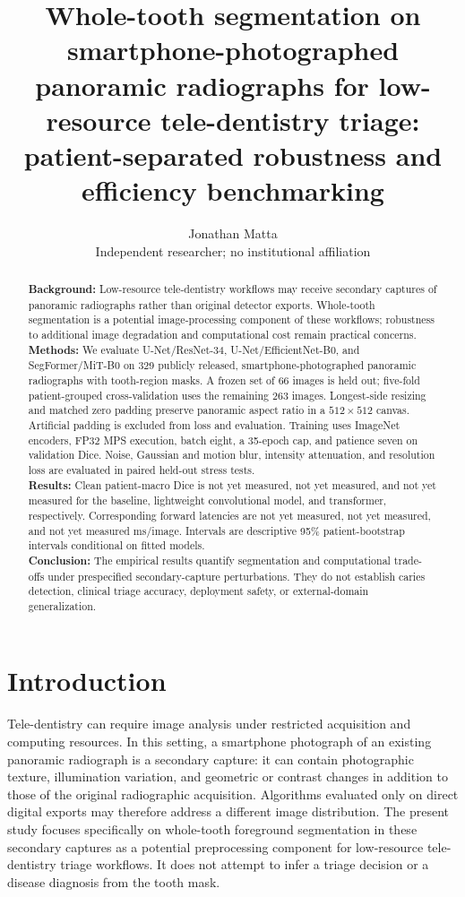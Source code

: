 \documentclass[11pt]{article}
\title{Whole-tooth segmentation on smartphone-photographed panoramic radiographs for low-resource tele-dentistry triage: patient-separated robustness and efficiency benchmarking}
\author{Jonathan Matta\\[3pt]\small Independent researcher; no institutional affiliation}
\date{}
\providecommand{\BaselineDice}{not yet measured}
\providecommand{\CNNDice}{not yet measured}
\providecommand{\TransformerDice}{not yet measured}
\providecommand{\BaselineLatency}{not yet measured}
\providecommand{\CNNLatency}{not yet measured}
\providecommand{\TransformerLatency}{not yet measured}
\begin{document}
\maketitle
\begin{abstract}
\noindent\textbf{Background:} Low-resource tele-dentistry workflows may receive secondary captures of panoramic radiographs rather than original detector exports. Whole-tooth segmentation is a potential image-processing component of these workflows; robustness to additional image degradation and computational cost remain practical concerns.\\
\textbf{Methods:} We evaluate U-Net/ResNet-34, U-Net/EfficientNet-B0, and SegFormer/MiT-B0 on 329 publicly released, smartphone-photographed panoramic radiographs with tooth-region masks. A frozen set of 66 images is held out; five-fold patient-grouped cross-validation uses the remaining 263 images. Longest-side resizing and matched zero padding preserve panoramic aspect ratio in a $512\times512$ canvas. Artificial padding is excluded from loss and evaluation. Training uses ImageNet encoders, FP32 MPS execution, batch eight, a 35-epoch cap, and patience seven on validation Dice. Noise, Gaussian and motion blur, intensity attenuation, and resolution loss are evaluated in paired held-out stress tests.\\
\textbf{Results:} Clean patient-macro Dice is \BaselineDice{}, \CNNDice{}, and \TransformerDice{} for the baseline, lightweight convolutional model, and transformer, respectively. Corresponding forward latencies are \BaselineLatency{}, \CNNLatency{}, and \TransformerLatency{} ms/image. Intervals are descriptive 95\% patient-bootstrap intervals conditional on fitted models.\\
\textbf{Conclusion:} The empirical results quantify segmentation and computational trade-offs under prespecified secondary-capture perturbations. They do not establish caries detection, clinical triage accuracy, deployment safety, or external-domain generalization.
\end{abstract}

\section{Introduction}
Tele-dentistry can require image analysis under restricted acquisition and computing resources. In this setting, a smartphone photograph of an existing panoramic radiograph is a secondary capture: it can contain photographic texture, illumination variation, and geometric or contrast changes in addition to those of the original radiographic acquisition. Algorithms evaluated only on direct digital exports may therefore address a different image distribution. The present study focuses specifically on whole-tooth foreground segmentation in these secondary captures as a potential preprocessing component for low-resource tele-dentistry triage workflows. It does not attempt to infer a triage decision or a disease diagnosis from the tooth mask.
\end{document}
